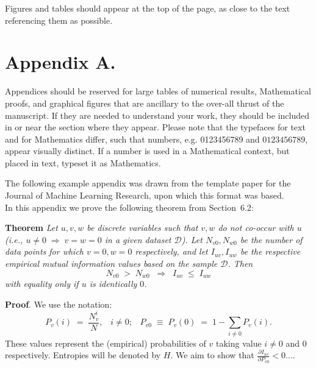 \documentclass[twoside,12pt]{article}
\newcommand{\dataset}{{\mathcal D}}
\newcommand{\fracpartial}[2]{\frac{\partial #1}{\partial  #2}}
\begin{document}
Figures and tables should appear at the top of the page, as close to the text referencing them as possible.





\appendix
\section*{Appendix A.}
\label{app:theorem}

Appendices should be reserved for large tables of numerical results, Mathematical proofs, and graphical figures that are ancillary to the over-all thrust of the manuscript. If they are needed to understand your work, they should be included in or near the section where they appear. Please note that the typefaces for text and for Mathematics differ, such that numbers, e.g. 0123456789 and $0123456789$, appear visually distinct. If a number is used in a Mathematical context, but placed in text, typeset it as Mathematics.

The following example appendix was drawn from the template paper for the Journal of Machine Learning Research\cite{meila2000learning}, upon which this format was based.\\


In this appendix we prove the following theorem from
Section~6.2:

\noindent
{\bf Theorem} {\it Let $u,v,w$ be discrete variables such that $v, w$ do
not co-occur with $u$ (i.e., $u\neq0\;\Rightarrow \;v=w=0$ in a given
dataset $\dataset$). Let $N_{v0},N_{w0}$ be the number of data points for
which $v=0, w=0$ respectively, and let $I_{uv},I_{uw}$ be the
respective empirical mutual information values based on the sample
$\dataset$. Then
\[
	N_{v0} \;>\; N_{w0}\;\;\Rightarrow\;\;I_{uv} \;\leq\;I_{uw}
\]
with equality only if $u$ is identically $0$.} \hfill\BlackBox

\noindent
{\bf Proof}. We use the notation:
\[
P_v(i) \;=\;\frac{N_v^i}{N},\;\;\;i \neq 0;\;\;\;
P_{v0}\;\equiv\;P_v(0)\; = \;1 - \sum_{i\neq 0}P_v(i).
\]
These values represent the (empirical) probabilities of $v$
taking value $i\neq 0$ and 0 respectively.  Entropies will be denoted
by $H$. We aim to show that $\fracpartial{I_{uv}}{P_{v0}} < 0$....\\
\end{document}
